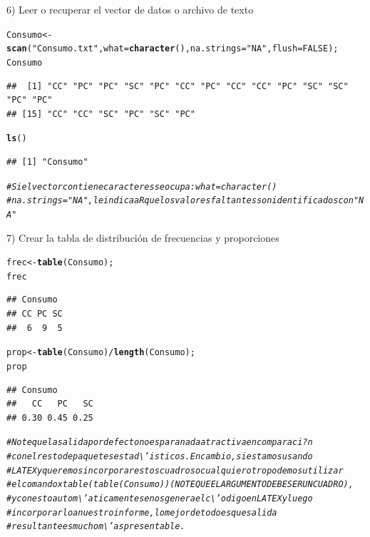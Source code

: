 \documentclass[12pt,letterpaper]{article}\usepackage[]{graphicx}\usepackage[]{color}
\makeatletter
\newcommand{\hlnum}[1]{\textcolor[rgb]{0.686,0.059,0.569}{#1}}%
\newcommand{\hlstr}[1]{\textcolor[rgb]{0.192,0.494,0.8}{#1}}%
\newcommand{\hlcom}[1]{\textcolor[rgb]{0.678,0.584,0.686}{\textit{#1}}}%
\newcommand{\hlopt}[1]{\textcolor[rgb]{0,0,0}{#1}}%
\newcommand{\hlstd}[1]{\textcolor[rgb]{0.345,0.345,0.345}{#1}}%
\newcommand{\hlkwb}[1]{\textcolor[rgb]{0.69,0.353,0.396}{#1}}%
\newcommand{\hlkwc}[1]{\textcolor[rgb]{0.333,0.667,0.333}{#1}}%
\newcommand{\hlkwd}[1]{\textcolor[rgb]{0.737,0.353,0.396}{\textbf{#1}}}%
\newenvironment{kframe}{%
 \def\at@end@of@kframe{}%
 \ifinner\ifhmode%
  \def\at@end@of@kframe{\end{minipage}}%
  \begin{minipage}{\columnwidth}%
 \fi\fi%
 \def\FrameCommand##1{\hskip\@totalleftmargin \hskip-\fboxsep
 \colorbox{shadecolor}{##1}\hskip-\fboxsep
     \hskip-\linewidth \hskip-\@totalleftmargin \hskip\columnwidth}%
 \MakeFramed {\advance\hsize-\width
   \@totalleftmargin\z@ \linewidth\hsize
   \@setminipage}}%
 {\par\unskip\endMakeFramed%
 \at@end@of@kframe}
\newenvironment{knitrout}{}{} %
\makeatother
\begin{document}
6) Leer o recuperar el vector de datos o archivo de texto
\begin{knitrout}
\color{fgcolor}\begin{kframe}
\begin{alltt}
\hlstd{Consumo} \hlkwb{<-} \hlkwd{scan}\hlstd{(}\hlstr{"Consumo.txt"}\hlstd{,} \hlkwc{what} \hlstd{=} \hlkwd{character}\hlstd{(),} \hlkwc{na.strings} \hlstd{=} \hlstr{"NA"}\hlstd{,}\hlkwc{flush}\hlstd{=}\hlnum{FALSE}\hlstd{);}
\hlstd{Consumo}
\end{alltt}
\begin{verbatim}
##  [1] "CC" "PC" "PC" "SC" "PC" "CC" "PC" "CC" "CC" "PC" "SC" "SC" "PC" "PC"
## [15] "CC" "CC" "SC" "PC" "SC" "PC"
\end{verbatim}
\begin{alltt}
\hlkwd{ls}\hlstd{()}
\end{alltt}
\begin{verbatim}
## [1] "Consumo"
\end{verbatim}
\begin{alltt}
\hlcom{# Si el vector contiene caracteres se ocupa: what = character()}
\hlcom{# na.strings ="NA", le indica a R que los valores faltantes son identificados con "NA"}
\end{alltt}
\end{kframe}
\end{knitrout}

7) Crear la tabla de distribuci\'on de frecuencias y proporciones
\begin{knitrout}
\color{fgcolor}\begin{kframe}
\begin{alltt}
\hlstd{frec} \hlkwb{<-} \hlkwd{table}\hlstd{(Consumo);}
\hlstd{frec}
\end{alltt}
\begin{verbatim}
## Consumo
## CC PC SC 
##  6  9  5
\end{verbatim}
\begin{alltt}
\hlstd{prop} \hlkwb{<-} \hlkwd{table}\hlstd{(Consumo)}\hlopt{/}\hlkwd{length}\hlstd{(Consumo);}
\hlstd{prop}
\end{alltt}
\begin{verbatim}
## Consumo
##   CC   PC   SC 
## 0.30 0.45 0.25
\end{verbatim}
\begin{alltt}
\hlcom{# Note que la salida por defecto no es para nada atractiva en comparaci?n }
\hlcom{# con el resto de paquetes estad\textbackslash{}'isticos.En cambio, si estamos usando }
\hlcom{# LATEX y queremos incorporar estos cuadros o cualquier otro podemos utilizar }
\hlcom{# el comando xtable(table(Consumo)) (NOTE QUE EL ARGUMENTO DEBE SER UN CUADRO), }
\hlcom{# y con esto autom\textbackslash{}'aticamente se nos genera el c\textbackslash{}'odigo en LATEX y luego }
\hlcom{#incorporarlo a nuestro informe, lo mejor de todo es que salida }
\hlcom{# resultante es mucho m\textbackslash{}'as presentable.}
\end{alltt}
\end{kframe}
\end{knitrout}
\end{document}
